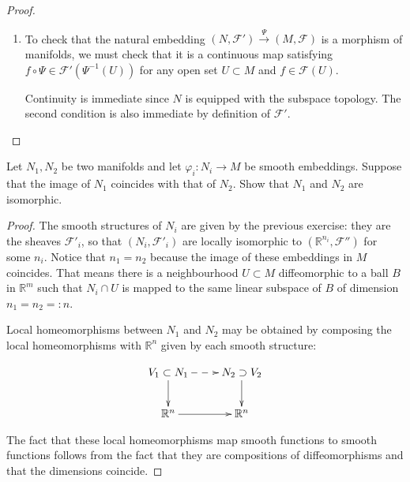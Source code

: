 \begin{proof}
\begin{enumerate}
Conversely, a function
$f' \in \mathcal{F}'(U \cap N)$ may be
smoothly extended to a function on some open
set of $M$ by definition. Intersecting such
a set with $U$ and restricting smooth
functions, we may suppose it is isomorphic
to $(\mathbb{R}^n,\mathcal{F}'')$. Then
$\varphi$ maps the extension of $f'$ to a
smooth function on $\mathbb{R}^n$, whose
restriction to $V$ is an element of
$\mathcal{F}''(V)$.

\item To check that the natural embedding
$(N,\mathcal{F}') \xrightarrow{\Psi}
(M,\mathcal{F})$ is a morphism of manifolds,
we must check that it is a continuous map
satisfying $f \circ \Psi \in
\mathcal{F}'(\Psi^{-1}(U))$ for any open set
$U \subset M$ and $f \in \mathcal{F}(U)$.

Continuity is immediate since $N$ is
equipped with the subspace topology. The
second condition is also immediate by
definition of $\mathcal{F}'$.
\end{enumerate}
\end{proof}

\begin{exercise}
\label{exercise-same-image-embedded-submanifolds}
Let $N_1,N_2$ be two manifolds and let
$\varphi_i:N_i \to M$ be smooth embeddings.
Suppose that the image of $N_1$ coincides
with that of $N_2$. Show that $N_1$ and
$N_2$ are isomorphic.
\end{exercise}

\begin{proof}
The smooth structures of $N_i$ are given by
the previous exercise: they are the sheaves
$\mathcal{F}'_i$, so that
$(N_i,\mathcal{F}'_i)$ are locally
isomorphic to $(\mathbb{R}^{n_i},\mathcal{F}'')$
for some $n_i$. Notice that $n_1=n_2$
because the image of these embeddings in $M$
coincides. That means there is a
neighbourhood $U \subset M$ diffeomorphic to
a ball $B$ in $\mathbb{R}^m$ such that
$N_i \cap U$ is mapped to the same linear
subspace of $B$ of dimension
$n_1=n_2=:n$.

Local homeomorphisms between $N_1$ and $N_2$
may be obtained by composing the local
homeomorphisms with $\mathbb{R}^n$ given by
each smooth structure:

$$
\xymatrix{
V_1 \subset N_1 \ar@{-->}[r] \ar[d]
& N_2 \supset V_2 \ar[d] \\
\mathbb{R}^n \ar[r]
& \mathbb{R}^n
}
$$

The fact that these local homeomorphisms
map smooth functions to smooth functions
follows from the fact that they are
compositions of diffeomorphisms and that the
dimensions coincide.
\end{proof}

